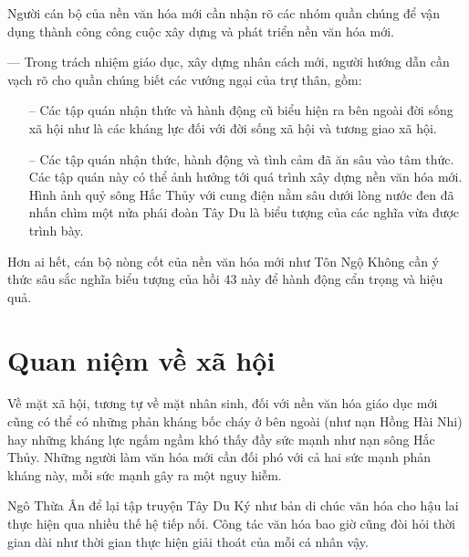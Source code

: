 Người cán bộ của nền văn hóa mới cần nhận rõ các nhóm quần chúng để vận dụng thành công công cuộc xây dựng và phát triển nền văn hóa mới.

— Trong trách nhiệm giáo dục, xây dựng nhân cách mới, người hướng dẫn cần vạch rõ cho quần chúng biết các vướng ngại của trự thân, gồm:

\begin{itemize}
    \item[–] Các tập quán nhận thức và hành động cũ biểu hiện ra bên ngoài đời sống xã hội như là các kháng lực đối với đời sống xã hội và tương giao xã hội.

    \item[–] Các tập quán nhận thức, hành động và tình cảm đã ăn sâu vào tâm thức. Các tập quán này có thể ảnh hưởng tới quá trình xây dựng nền văn hóa mới. Hình ảnh quỷ sông Hắc Thủy với cung điện nằm sâu dưới lòng nước đen đã nhấn chìm một nửa phái đoàn Tây Du là biểu tượng của các nghĩa vừa được trình bày.
\end{itemize}

Hơn ai hết, cán bộ nòng cốt của nền văn hóa mới như Tôn Ngộ Không cần ý thức sâu sắc nghĩa biểu tượng của hồi 43 này để hành động cẩn trọng và hiệu quả.

\section{Quan niệm về xã hội} %
\label{sec:43_xa_hoi}

Về mặt xã hội, tương tự về mặt nhân sinh, đối với nền văn hóa giáo dục mới cũng có thể có những phản kháng bốc cháy ở bên ngoài (như nạn Hồng Hài Nhi) hay những kháng lực ngấm ngầm khó thấy đầy sức mạnh như nạn sông Hắc Thủy. Những người làm văn hóa mới cần đối phó với cả hai sức mạnh phản kháng này, mỗi sức mạnh gây ra một nguy hiễm.

Ngô Thừa Ân để lại tập truyện Tây Du Ký như bản di chúc văn hóa cho hậu lai thực hiện qua nhiều thế hệ tiếp nối. Công tác văn hóa bao giờ cũng đòi hỏi thời gian dài như thời gian thực hiện giải thoát của mỗi cá nhân vậy.
